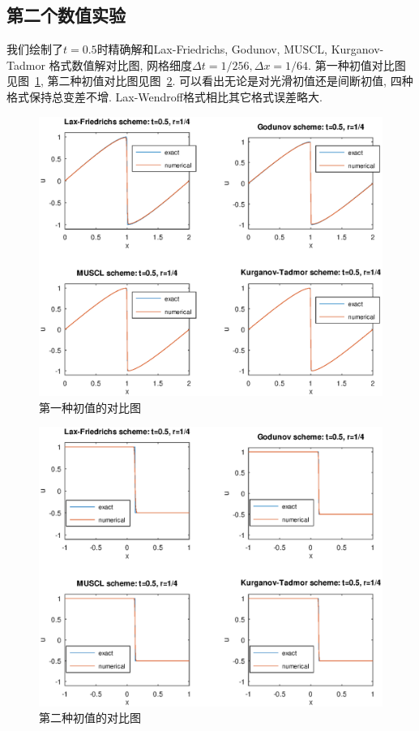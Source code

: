 \documentclass[a4paper, 12pt]{amsart}
\numberwithin{equation}{section}
\begin{document}
\subsection{第二个数值实验}\hspace*{\fill}\par
我们绘制了$t=0.5$时精确解和Lax-Friedrichs, Godunov, MUSCL, Kurganov-Tadmor 格式数值解对比图, 网格细度$\Delta t=1/256,\Delta x=1/64$. 第一种初值对比图见图~\ref{fig:task1}, 第二种初值对比图见图~\ref{fig:task2}. 可以看出无论是对光滑初值还是间断初值, 四种格式保持总变差不增. Lax-Wendroff格式相比其它格式误差略大.
\begin{figure}[htbp]\centering
\includegraphics[width=\textwidth]{eq1.eps}
\caption{第一种初值的对比图}\label{fig:task1}
\end{figure}

\begin{figure}[htbp]\centering
\includegraphics[width=\textwidth]{eq2.eps}
\caption{第二种初值的对比图}\label{fig:task2}
\end{figure}
\end{document}

